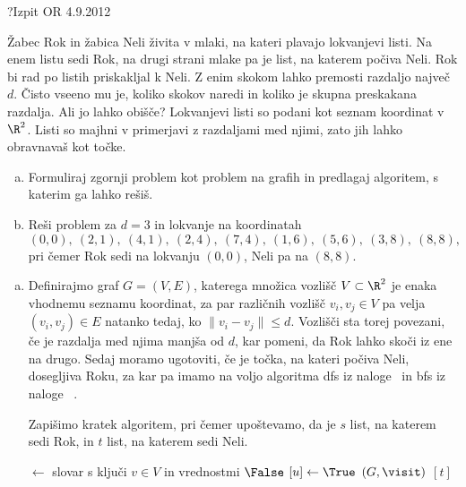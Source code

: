 \begin{naloga}{?}{Izpit OR 4.9.2012}
\begin{vprasanje}
Žabec Rok in žabica Neli živita v mlaki,
na kateri plavajo lokvanjevi listi.
Na enem listu sedi Rok,
na drugi strani mlake pa je list, na katerem počiva Neli.
Rok bi rad po listih priskakljal k Neli.
Z enim skokom lahko premosti razdaljo največ $d$.
Čisto vseeno mu je, koliko skokov naredi
in koliko je skupna preskakana razdalja.
Ali jo lahko obišče?
Lokvanjevi listi so podani kot seznam koordinat v $\R^2$.
Listi so majhni v primerjavi z razdaljami med njimi,
zato jih lahko obravnavaš kot točke.

\begin{enumerate}[(a)]
\item Formuliraj zgornji problem kot problem na grafih in predlagaj algoritem,
s katerim ga lahko rešiš.

\item Reši problem za $d = 3$ in lokvanje na koordinatah
$$
(0, 0), \ (2, 1), \ (4, 1), \ (2, 4), \ (7, 4),
\ (1, 6), \ (5, 6), \ (3, 8), \ (8, 8),
$$
pri čemer Rok sedi na lokvanju $(0, 0)$, Neli pa na $(8, 8)$.
\end{enumerate}
\end{vprasanje}

\begin{odgovor}
\begin{enumerate}[(a)]
\item Definirajmo graf $G = (V, E)$,
katerega množica vozlišč $V \subset \R^2$
je enaka vhod\-nemu seznamu koordinat,
za par različnih vozlišč $v_i, v_j \in V$
pa velja $(v_i, v_j) \in E$ natanko tedaj,
ko $\|v_i - v_j\|  \leq d$.
Vozlišči sta torej povezani, če je razdalja med njima manjša od $d$,
kar pomeni, da Rok lahko skoči iz ene na drugo.
Sedaj moramo ugotoviti, če je točka, na kateri počiva Neli, dosegljiva Roku, 
za kar pa imamo na voljo algoritma {\sc dfs} iz naloge ~\nal[dfs] in {\sc bfs} iz naloge ~\nal[bfs].

Zapišimo kratek algoritem, pri čemer upoštevamo, da je $s$ list, na katerem sedi Rok, in $t$ list, na katerem sedi Neli.
\begin{small}
\begin{algorithmic}
	 $\gets$ slovar s ključi $v \in V$
                                 in vrednostmi $\False$
		$[u] \gets \True$
	\EndFunction
	$(G, \visit)$
	\State {}$[t]$
\EndFunction
\end{algorithmic}
\end{small}


\end{enumerate}
\end{odgovor}
\end{naloga}
